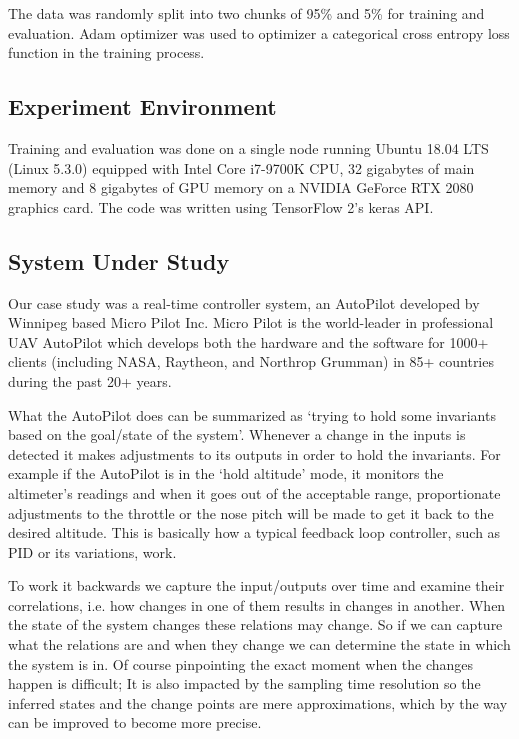 The data was randomly split into two chunks of 95\% and 5\% for training and evaluation.
Adam optimizer \cite{kingma2014adam} was used to optimizer a categorical cross entropy loss function in the training process.



\subsection{Experiment Environment}
Training and evaluation was done on a single node running Ubuntu 18.04 LTS (Linux 5.3.0) equipped with Intel Core i7-9700K CPU, 32 gigabytes of main memory and 8 gigabytes of GPU memory on a NVIDIA GeForce RTX 2080 graphics card.
The code was written using TensorFlow 2's keras API.



\subsection{System Under Study}

Our case study was a real-time controller system, an AutoPilot developed by Winnipeg based Micro Pilot Inc. Micro Pilot is the world-leader in professional UAV AutoPilot which develops both the hardware and the software for 1000+ clients (including NASA, Raytheon, and Northrop Grumman) in 85+ countries during the past 20+ years.

What the AutoPilot does can be summarized as `trying to hold some invariants based on the goal/state of the system'.
Whenever a change in the inputs is detected it makes adjustments to its outputs in order to hold the invariants. 
For example if the AutoPilot is in the `hold altitude' mode, it monitors the altimeter's readings and when it goes out of the acceptable range, proportionate adjustments to the throttle or the nose pitch will be made to get it back to the desired altitude. This is basically how a typical feedback loop controller, such as PID or its variations, work. \cite{feedbacksystemsBook}

\label{changes_in_inputs}
To work it backwards we capture the input/outputs over time and examine their correlations, i.e. how changes in one of them results in changes in another. When the state of the system changes these relations may change. So if we can capture what the relations are and when they change we can determine the state in which the system is in. 
Of course pinpointing the exact moment when the changes happen is difficult; It is also impacted by the sampling time resolution so the inferred states and the change points are mere approximations, which by the way can be improved to become more precise.

